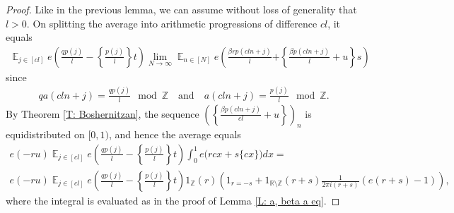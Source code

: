 \documentclass[11pt]{amsart}
\theoremstyle{definition}
\DeclareMathOperator*{\E}{\mathbb{E}}
\newcommand{\R}{{\mathbb R}}
\newcommand{\Z}{{\mathbb Z}}
\newcommand{\1}{{\mathbf{1}}}
\newcommand{\brac}[1]{\mathopen{}\left( #1 \mathclose{}\right)}
\newcommand{\rem}[1]{\left \{ #1 \right \}}
\begin{document}
\begin{proof}
{Like in the previous lemma, we can assume without loss of generality that $l>0$.}
On splitting the average into arithmetic progressions of difference $cl$, it equals
\begin{align*}
\E_{j\in[cl]}e\brac{\frac{q p(j)}{l}-\rem{\frac{p(j)}{l}}t} \lim_{N\to\infty}\E_{n\in[N]} e\left(\frac{\beta r p(cln+j)}{l} \right. 
    \left.    +\rem{\frac{\beta p(cln+j)}{l} +u}s\right)
\end{align*}
since
\begin{align*}
    qa(cl n + j) = \frac{q p(j)}{l}\!\!\!\! \mod \Z \quad \textrm{and}\quad 
    a(cl n + j) = \frac{p(j)}{l}\!\!\!\! \mod\Z.
\end{align*}
By Theorem \ref{T: Boshernitzan}, the sequence $\brac{\rem{\frac{\beta p(cln+j)}{cl}+u}}_n$ is equidistributed on $[0,1)$, and hence the average equals
\begin{multline*}
    e(-ru)\E_{j\in[cl]}e\brac{\frac{q p(j)}{l}-\rem{\frac{p(j)}{l}}t}\int_{0}^{1} e\big(rcx+s\{cx\}\big)dx=\\
     e(-ru)\E_{j\in[cl]}e\brac{\frac{q p(j)}{l}-\rem{\frac{p(j)}{l}}t}1_\Z(r)\brac{1_{r=-s} + 
    1_{\R\setminus\Z}(r+s)\frac{1}{2\pi i(r+s)}(e(r+s)-1)},
\end{multline*}
where the integral is evaluated as in the proof of Lemma \ref{L: a, beta a eq}.
\end{proof}
\end{document}
